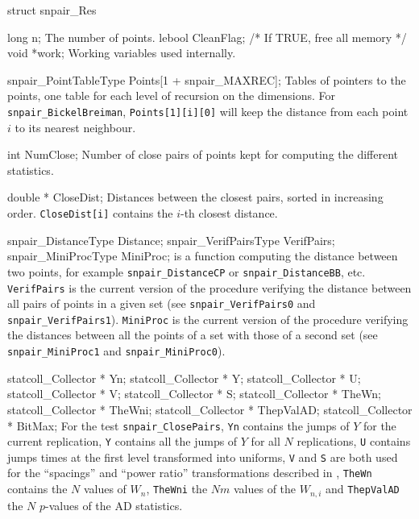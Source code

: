 struct snpair_Res {

   long n;
\endcode
 \tabb The number of points.   
 \endtabb
\fi
\hide  %
\code
   lebool CleanFlag;               /* If TRUE, free all memory */
   void *work;
\endcode
 \tabb Working variables used internally.   
 \endtabb
\endhide
\ifdetailed
\code

   snpair_PointTableType Points[1 + snpair_MAXREC];
\endcode
 \tabb  Tables of pointers to the points, one table for each
   level of recursion on the dimensions.
   For {\tt snpair\_BickelBreiman}, {\tt Points[1][i][0]}
   will keep the distance from each
   point $i$ to its nearest neighbour. 
 \endtabb
\code

   int NumClose;
\endcode
 \tabb  Number of close pairs of points kept for computing the different 
   statistics.
 \endtabb
\code

   double * CloseDist;
\endcode
 \tabb  Distances between the closest pairs, sorted in increasing order.
   {\tt CloseDist[i]} contains the $i$-th closest distance.
 \endtabb
\fi\hide  %
\code

   snpair_DistanceType   Distance;
   snpair_VerifPairsType VerifPairs;
   snpair_MiniProcType   MiniProc;
\endcode
  is a function computing the distance between
  two points,  for example {\tt snpair\_Dis\-tanceCP} or
  {\tt snpair\_DistanceBB}, etc.
  {\tt VerifPairs} is the current version of the procedure
  verifying the distance between all pairs of points in a given set
  (see {\tt snpair\_VerifPairs0} and {\tt snpair\_VerifPairs1}).
  {\tt MiniProc} is the current version of the procedure
  verifying the distances between all the points of a set  with
  those of a second set (see {\tt snpair\_MiniProc1}
  and {\tt snpair\_MiniProc0}).
 \endtabb
\endhide\ifdetailed  %
\code

   statcoll_Collector * Yn;
   statcoll_Collector * Y;
   statcoll_Collector * U;
   statcoll_Collector * V;
   statcoll_Collector * S;
   statcoll_Collector * TheWn;
   statcoll_Collector * TheWni;
   statcoll_Collector * ThepValAD;
   statcoll_Collector * BitMax;
\endcode
 \tabb For the test {\tt snpair\_ClosePairs},
  {\tt Yn} contains the jumps of $Y$ for the current replication,
 {\tt Y} contains all the jumps of $Y$ for all $N$ replications,
 {\tt U} contains jumps times at the first level transformed into
  uniforms, {\tt V} and {\tt S} are both used for the
 ``spacings'' and ``power ratio'' transformations described
 in \cite{rLEC00c},
 {\tt TheWn} contains the $N$ values of $W_n$,
 {\tt TheWni} the $Nm$ values of the $W_{n,i}$ and
 {\tt ThepValAD} the $N$ $p$-values of the AD statistics.

}
